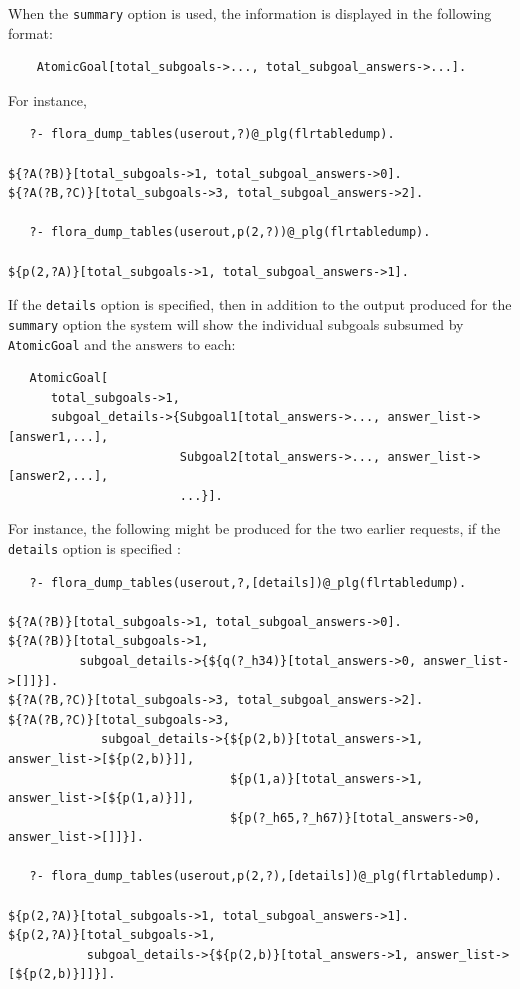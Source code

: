 \documentclass[11pt]{article}
\begin{document}
When the \texttt{summary}  option is used, the information is displayed in the
following format:
\begin{verbatim}
    AtomicGoal[total_subgoals->..., total_subgoal_answers->...].
\end{verbatim}
For instance,
\begin{verbatim}
   ?- flora_dump_tables(userout,?)@_plg(flrtabledump).

${?A(?B)}[total_subgoals->1, total_subgoal_answers->0].
${?A(?B,?C)}[total_subgoals->3, total_subgoal_answers->2].

   ?- flora_dump_tables(userout,p(2,?))@_plg(flrtabledump).

${p(2,?A)}[total_subgoals->1, total_subgoal_answers->1].
\end{verbatim}
If the \texttt{details} option is specified, then in addition to the output
produced for the \texttt{summary} option the system will show the
individual subgoals subsumed by \texttt{AtomicGoal} and the answers to
each:
\begin{verbatim}
   AtomicGoal[
      total_subgoals->1,
      subgoal_details->{Subgoal1[total_answers->..., answer_list->[answer1,...],
                        Subgoal2[total_answers->..., answer_list->[answer2,...],
                        ...}].
\end{verbatim}
For instance, the following might be produced for the two earlier requests,
if the \texttt{details} option is specified :
\begin{verbatim}
   ?- flora_dump_tables(userout,?,[details])@_plg(flrtabledump).

${?A(?B)}[total_subgoals->1, total_subgoal_answers->0].
${?A(?B)}[total_subgoals->1,
          subgoal_details->{${q(?_h34)}[total_answers->0, answer_list->[]]}].
${?A(?B,?C)}[total_subgoals->3, total_subgoal_answers->2].
${?A(?B,?C)}[total_subgoals->3,
             subgoal_details->{${p(2,b)}[total_answers->1, answer_list->[${p(2,b)}]],
                               ${p(1,a)}[total_answers->1, answer_list->[${p(1,a)}]],
                               ${p(?_h65,?_h67)}[total_answers->0, answer_list->[]]}].

   ?- flora_dump_tables(userout,p(2,?),[details])@_plg(flrtabledump).

${p(2,?A)}[total_subgoals->1, total_subgoal_answers->1].
${p(2,?A)}[total_subgoals->1,
           subgoal_details->{${p(2,b)}[total_answers->1, answer_list->[${p(2,b)}]]}].

\end{verbatim}
\end{document}
